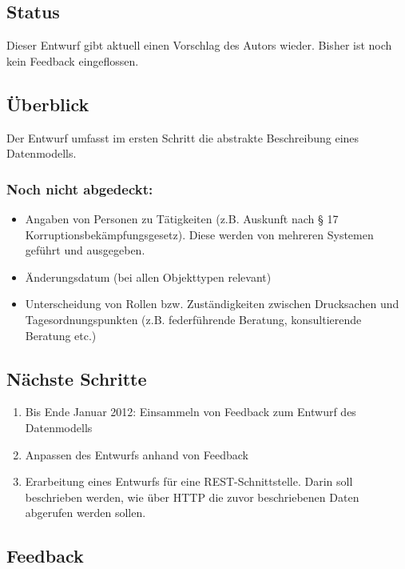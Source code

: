 \documentclass[,a4paper]{article}
\begin{document}
\subsection{Status}

Dieser Entwurf gibt aktuell einen Vorschlag des Autors wieder. Bisher
ist noch kein Feedback eingeflossen.

\subsection{Überblick}

Der Entwurf umfasst im ersten Schritt die abstrakte Beschreibung eines
Datenmodells.

\subsubsection{Noch nicht abgedeckt:}

\begin{itemize}
\item
  Angaben von Personen zu Tätigkeiten (z.B. Auskunft nach § 17
  Korruptionsbekämpfungsgesetz). Diese werden von mehreren Systemen
  geführt und ausgegeben.
\item
  Änderungsdatum (bei allen Objekttypen relevant)
\item
  Unterscheidung von Rollen bzw. Zuständigkeiten zwischen Drucksachen
  und Tagesordnungspunkten (z.B. federführende Beratung, konsultierende
  Beratung etc.)
\end{itemize}

\subsection{Nächste Schritte}

\begin{enumerate}[1.]
\item
  Bis Ende Januar 2012: Einsammeln von Feedback zum Entwurf des
  Datenmodells
\item
  Anpassen des Entwurfs anhand von Feedback
\item
  Erarbeitung eines Entwurfs für eine REST-Schnittstelle. Darin soll
  beschrieben werden, wie über HTTP die zuvor beschriebenen Daten
  abgerufen werden sollen.
\end{enumerate}

\subsection{Feedback}
\end{document}
